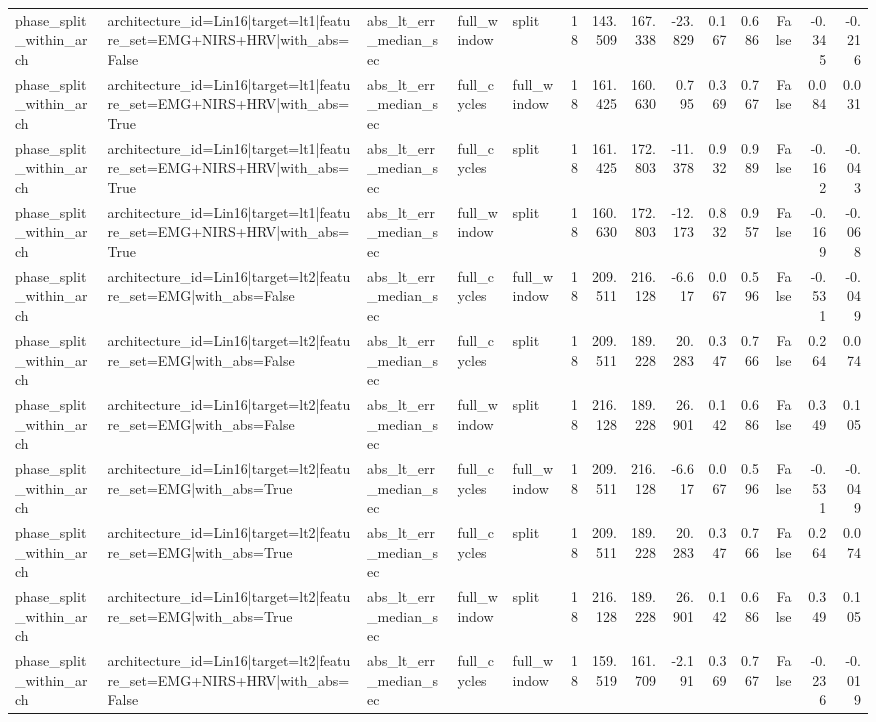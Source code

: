\begin{table}
\begin{tabular}{lllllrrrrrrrrr}
phase_split_within_arch & architecture_id=Lin16|target=lt1|feature_set=EMG+NIRS+HRV|with_abs=False & abs_lt_err_median_sec & full_window & split & 18 & 143.509 & 167.338 & -23.829 & 0.167 & 0.686 & False & -0.345 & -0.216 \\
phase_split_within_arch & architecture_id=Lin16|target=lt1|feature_set=EMG+NIRS+HRV|with_abs=True & abs_lt_err_median_sec & full_cycles & full_window & 18 & 161.425 & 160.630 & 0.795 & 0.369 & 0.767 & False & 0.084 & 0.031 \\
phase_split_within_arch & architecture_id=Lin16|target=lt1|feature_set=EMG+NIRS+HRV|with_abs=True & abs_lt_err_median_sec & full_cycles & split & 18 & 161.425 & 172.803 & -11.378 & 0.932 & 0.989 & False & -0.162 & -0.043 \\
phase_split_within_arch & architecture_id=Lin16|target=lt1|feature_set=EMG+NIRS+HRV|with_abs=True & abs_lt_err_median_sec & full_window & split & 18 & 160.630 & 172.803 & -12.173 & 0.832 & 0.957 & False & -0.169 & -0.068 \\
phase_split_within_arch & architecture_id=Lin16|target=lt2|feature_set=EMG|with_abs=False & abs_lt_err_median_sec & full_cycles & full_window & 18 & 209.511 & 216.128 & -6.617 & 0.067 & 0.596 & False & -0.531 & -0.049 \\
phase_split_within_arch & architecture_id=Lin16|target=lt2|feature_set=EMG|with_abs=False & abs_lt_err_median_sec & full_cycles & split & 18 & 209.511 & 189.228 & 20.283 & 0.347 & 0.766 & False & 0.264 & 0.074 \\
phase_split_within_arch & architecture_id=Lin16|target=lt2|feature_set=EMG|with_abs=False & abs_lt_err_median_sec & full_window & split & 18 & 216.128 & 189.228 & 26.901 & 0.142 & 0.686 & False & 0.349 & 0.105 \\
phase_split_within_arch & architecture_id=Lin16|target=lt2|feature_set=EMG|with_abs=True & abs_lt_err_median_sec & full_cycles & full_window & 18 & 209.511 & 216.128 & -6.617 & 0.067 & 0.596 & False & -0.531 & -0.049 \\
phase_split_within_arch & architecture_id=Lin16|target=lt2|feature_set=EMG|with_abs=True & abs_lt_err_median_sec & full_cycles & split & 18 & 209.511 & 189.228 & 20.283 & 0.347 & 0.766 & False & 0.264 & 0.074 \\
phase_split_within_arch & architecture_id=Lin16|target=lt2|feature_set=EMG|with_abs=True & abs_lt_err_median_sec & full_window & split & 18 & 216.128 & 189.228 & 26.901 & 0.142 & 0.686 & False & 0.349 & 0.105 \\
phase_split_within_arch & architecture_id=Lin16|target=lt2|feature_set=EMG+NIRS+HRV|with_abs=False & abs_lt_err_median_sec & full_cycles & full_window & 18 & 159.519 & 161.709 & -2.191 & 0.369 & 0.767 & False & -0.236 & -0.019 \\

\end{tabular}
\end{table}
